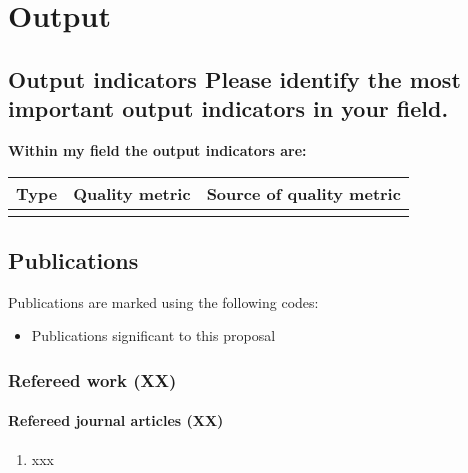 \section{Output}

\subsection{Output indicators \textnormal{\small Please identify the most
important output indicators in your field.}}


\noindent \textbf{Within my field the output indicators are:}

\begin{table}[h!]
\begin{tabular}{p{10em}p{7em}p{21em}}
\hline
\T\B \textbf{Type}&\textbf{Quality metric}&\textbf{Source of quality metric}\\
\hline

\T\B &&\\

\hline

\end{tabular}
\end{table}

\subsection{Publications}

Publications are marked using the following codes:
\begin{itemize}[leftmargin=2.5em]
  \item Publications significant to this proposal
\end{itemize}

\subsubsection*{Refereed work (XX)}

\paragraph*{Refereed journal articles (XX) }

\begin{enumerate}[leftmargin=2.5em]
\item xxx
\setcounter{enumTemp}{\theenumi}
\end{enumerate}

